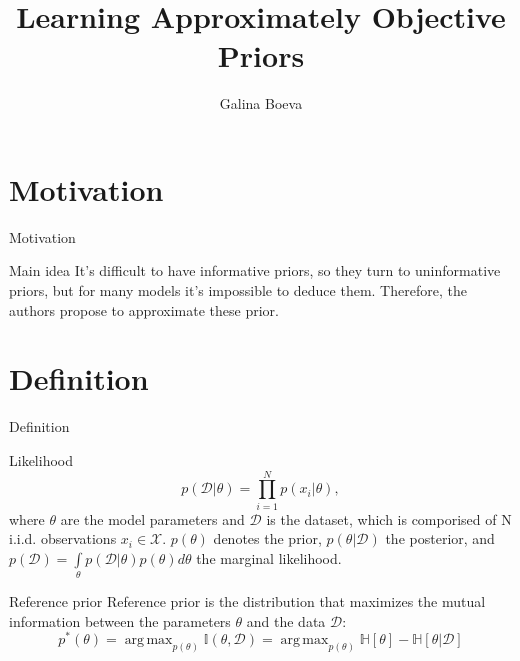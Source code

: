 \documentclass{beamer}
\title{Learning Approximately Objective Priors}
\author{Galina Boeva}
\institute{MIPT, 2023}
\DeclareMathOperator*{\argmax}{arg\,max}
\begin{document}
\begin{frame}
    \titlepage
\end{frame}


\begin{frame}
    \tableofcontents
\end{frame}


\section{Motivation}
\begin{frame}{Motivation}
    \begin{block}{Main idea}
    It's difficult to have informative priors, so they turn to uninformative priors, but for many models it's impossible to deduce them. Therefore, the authors propose to approximate these prior.
    \end{block} 
\end{frame}

\section{Definition}
\begin{frame}{Definition}
    \begin{block}{Likelihood}
    \begin{equation}
        p(\mathcal{D}|\theta) = \displaystyle\prod_{i=1}^N p(x_i|\theta),
    \end{equation} 
        where $\theta$ are the model parameters and $\mathcal{D}$ is the dataset, which is comporised of N i.i.d. observations $x_i \in \mathcal{X}$. $p(\theta)$ denotes the prior, $p(\theta|\mathcal{D})$ the posterior, and $p(\mathcal{D}) =\int\limits_{\theta} p(\mathcal{D}|\theta)p(\theta)d\theta$ the marginal likelihood.
    \end{block}
    \begin{block}{Reference prior}
    Reference prior is the distribution that maximizes the mutual information between the parameters $\theta$ and the data $\mathcal{D}$:
    \begin{equation}
        p^{*}(\theta) = \displaystyle \argmax_{p(\theta)} \mathbb{I}(\theta, \mathcal{D}) = \displaystyle\argmax_{p(\theta)} \mathbb{H}[\theta]  - \mathbb{H}[\theta | \mathcal{D}]
    \end{equation}
    \end{block}
\end{frame}
\end{document}
